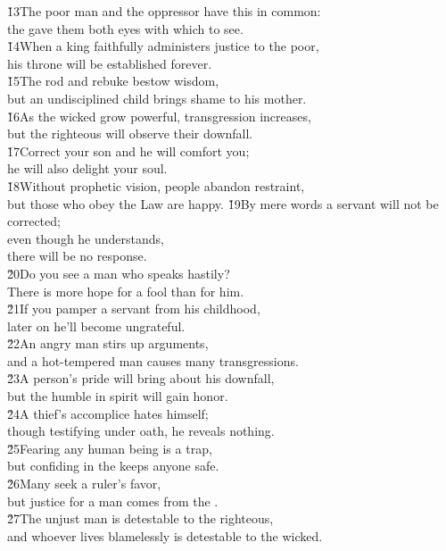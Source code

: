\begin{poetry}
\poeml \v{13}The poor man and the oppressor have this in common: \\
\poemll    the  gave them both eyes with which to see. \\
\poeml \v{14}When a king faithfully administers justice to the poor, \\
\poemll    his throne will be established forever. \\
\poeml \v{15}The rod and rebuke bestow wisdom, \\
\poemll    but an undisciplined child brings shame to his mother. \\
\poeml \v{16}As the wicked grow powerful, transgression increases, \\
\poemll    but the righteous will observe their downfall. \\
\poeml \v{17}Correct your son and he will comfort you; \\
\poemll    he will also delight your soul. \\
\poeml \v{18}Without prophetic vision, people abandon restraint, \\
\poemll    but those who obey the Law are happy.
\poeml \v{19}By mere words a servant will not be corrected; \\
\poemll    even though he understands, \\
\poemlll       there will be no response. \\
\poeml \v{20}Do you see a man who speaks hastily? \\
\poemll    There is more hope for a fool than for him. \\
\poeml \v{21}If you pamper a servant from his childhood, \\
\poemll    later on he'll become ungrateful. \\
\poeml \v{22}An angry man stirs up arguments, \\
\poemll    and a hot-tempered man causes many transgressions. \\
\poeml \v{23}A person's pride will bring about his downfall, \\
\poemll    but the humble in spirit will gain honor. \\
\poeml \v{24}A thief's accomplice hates himself; \\
\poemll    though testifying under oath, he reveals nothing. \\
\poeml \v{25}Fearing any human being is a trap, \\
\poemll    but confiding in the  keeps anyone safe. \\
\poeml \v{26}Many seek a ruler's favor, \\
\poemll    but justice for a man comes from the . \\
\poeml \v{27}The unjust man is detestable to the righteous, \\
\poemll    and whoever lives blamelessly is detestable to the wicked.
\end{poetry}

